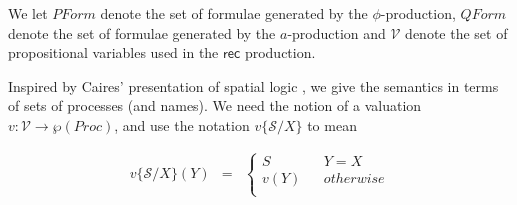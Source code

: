\documentclass[]{amsart}
\makeatletter
\newcommand{\id}[1]{\texttt{#1}}
\newcommand{\pzero}{\mathbin{0}}
\newcommand{\juxtap}{\mathbin{\id{|}}}
\newcommand{\concat}{\Rightarrow}
\newcommand{\scong}{\mathbin{\equiv}}
\newcommand{\nameeq}{\mathbin{\equiv_N}}
\newcommand{\binpar}[2]{#1 \juxtap #2}
\newcommand{\prefix}[3]{#1 ? ( #2 ) \concat #3}
\newcommand{\lift}[2]{#1 ! ( #2 )}
\newcommand{\quotep}[1]{@#1}
\newcommand{\dropn}[1]{*#1}
\newcommand{\substn}[2]{\id{\{} #1 / #2 \id{\}}}
\newcommand{\Proc}{\mathbin{Proc}}
\newcommand{\ptrue}{\mathbin{true}}
\newcommand{\pdropf}[1]{* #1}
\newcommand{\plift}[2]{#1 ! ( #2 )}
\newcommand{\pprefix}[3]{\langle #1 ? #2 \rangle #3}
\newcommand{\riff}{\Leftrightarrow}
\newcommand{\PFormula}{\mathbin{PForm}}
\newcommand{\QFormula}{\mathbin{QForm}}
\newcommand{\PropVar}{\mathbin{\mathcal{V}}}
\theoremstyle{definition}
\theoremstyle{remark}
\numberwithin{equation}{subsection}
\makeatother
\begin{document}
We let $\PFormula$ denote the set of formulae generated by the
$\phi$-production, $\QFormula$ denote the set of formulae generated by
the $a$-production and $\PropVar$ denote the set of propositional
variables used in the $\textsf{rec}$ production.



Inspired by Caires' presentation of spatial logic
\cite{DBLP:conf/fossacs/Caires04}, we give the semantics in terms of
sets of processes (and names). We need the notion of a valuation $v :
\PropVar \to \wp(\Proc)$, and use the notation $v\substn{\mathcal{S}}{X}$ to mean 

\begin{eqnarray}
  v\substn{\mathcal{S}}{X}(Y) & = &
  \left\{ \begin{array}{ccc}
      S & & Y = X \\
      v(Y) & & otherwise \\
    \end{array}
  \right.\nonumber
\end{eqnarray}
\end{document}
